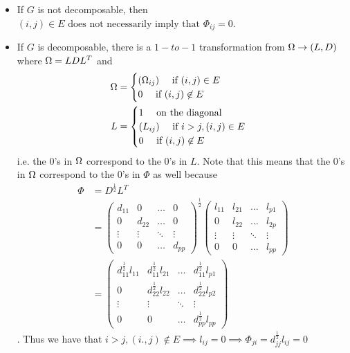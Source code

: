 \documentclass[12pt, leqno]{article}
\def\om{\ensuremath\Omega}
\begin{document}
\begin{itemize}
\item If $G$ is not decomposable, then $(i,j) \in E
  \text{ does not necessarily imply that }
  \Phi_{ij} = 0$.
\item If $G$ is decomposable, there is a $1-to-1$ transformation from
  $\om \to (L,D)$ where $\om = LDL^T$ and 
\begin{align*}
\om &= \begin{cases} (\om_{ij}) \quad \text{ if } {(i,j) \in E}\\
0 \quad \text{ if } {(i,j) \not\in E}
\end{cases} \\
L &= \begin{cases} 1 \quad \text{ on the diagonal}\\
(L_{ij}) \quad \text{ if } {i>j, (i,j) \in E}\\
0 \quad \text{ if } {(i,j) \not\in E}
\end{cases}
\end{align*} 
i.e. the 0's in $\om$ correspond to the 0's in $L$.
Note that this means that the 0's in $\om$ correspond to the 0's in
$\Phi$ as well because 
\begin{align*}
\Phi &= D^{\frac{1}{2}}L^T \\
&= \begin{pmatrix} 
d_{11} & 0 & \hdots & 0 \\
0 &d_{22} & \hdots&  0 \\
\vdots & \vdots &\ddots& \vdots\\
0 &0 & \hdots & d_{pp} 
\end{pmatrix}^{\frac{1}{2}} 
\begin{pmatrix} 
l_{11} & l_{21} & \hdots & l_{p1}\\
0 &l_{22} & \hdots&  l_{2p} \\
\vdots & \vdots &\ddots& \vdots\\
0 &0 & \hdots & l_{pp} 
\end{pmatrix} \\
&= \begin{pmatrix} 
d_{11}^\frac{1}{2} l_{11} & d_{11}^\frac{1}{2} l_{21} & \hdots & d_{11}^\frac{1}{2} l_{p1}\\
0 &d_{22}^\frac{1}{2} l_{22} & \hdots& d_{22}^\frac{1}{2} l_{p2} \\
\vdots & \vdots &\ddots& \vdots\\
0 &0 & \hdots & d_{pp}^\frac{1}{2} l_{pp} 
\end{pmatrix}
\end{align*}. 
Thus we have that $i>j,(i.,j) \not\in E \implies l_{ij} = 0 \implies \Phi_{ji} = d_{jj}^\frac{1}{2} l_{ij} = 0$
\end{itemize}
\end{document}
